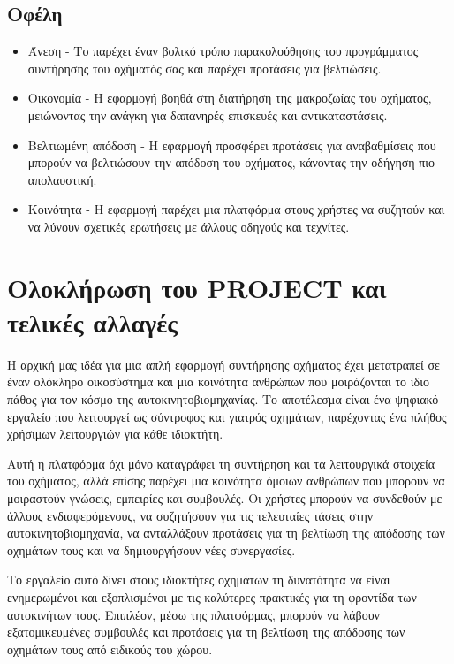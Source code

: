 \documentclass[11pt]{scrartcl} %
\begin{document}
\subsection{Οφέλη}
    \begin{itemize}
        \item Άνεση - Το  παρέχει έναν βολικό τρόπο παρακολούθησης του προγράμματος συντήρησης του οχήματός σας και παρέχει προτάσεις για βελτιώσεις.
        \item Οικονομία - Η εφαρμογή βοηθά στη διατήρηση της μακροζωίας του οχήματος, μειώνοντας την ανάγκη για δαπανηρές επισκευές και αντικαταστάσεις.
        \item Βελτιωμένη απόδοση - Η εφαρμογή προσφέρει προτάσεις για αναβαθμίσεις που μπορούν να βελτιώσουν την απόδοση του οχήματος, κάνοντας την οδήγηση πιο απολαυστική.
        \item Κοινότητα - Η εφαρμογή παρέχει μια πλατφόρμα στους χρήστες να συζητούν και να λύνουν σχετικές ερωτήσεις με άλλους οδηγούς και τεχνίτες.
    \end{itemize}

\pagebreak

\section{Ολοκλήρωση του PROJECT και τελικές αλλαγές}
Η αρχική μας ιδέα για μια απλή εφαρμογή συντήρησης οχήματος έχει μετατραπεί σε έναν ολόκληρο οικοσύστημα και μια κοινότητα ανθρώπων που μοιράζονται το ίδιο πάθος για τον κόσμο της αυτοκινητοβιομηχανίας. Το αποτέλεσμα είναι ένα ψηφιακό εργαλείο που λειτουργεί ως σύντροφος και γιατρός οχημάτων, παρέχοντας ένα πλήθος χρήσιμων λειτουργιών για κάθε ιδιοκτήτη.

Αυτή η πλατφόρμα όχι μόνο καταγράφει τη συντήρηση και τα λειτουργικά στοιχεία του οχήματος, αλλά επίσης παρέχει μια κοινότητα όμοιων ανθρώπων που μπορούν να μοιραστούν γνώσεις, εμπειρίες και συμβουλές. Οι χρήστες μπορούν να συνδεθούν με άλλους ενδιαφερόμενους, να συζητήσουν για τις τελευταίες τάσεις στην αυτοκινητοβιομηχανία, να ανταλλάξουν προτάσεις για τη βελτίωση της απόδοσης των οχημάτων τους και να δημιουργήσουν νέες συνεργασίες.

Το εργαλείο αυτό δίνει στους ιδιοκτήτες οχημάτων τη δυνατότητα να είναι ενημερωμένοι και εξοπλισμένοι με τις καλύτερες πρακτικές για τη φροντίδα των αυτοκινήτων τους. Επιπλέον, μέσω της πλατφόρμας, μπορούν να λάβουν εξατομικευμένες συμβουλές και προτάσεις για τη βελτίωση της απόδοσης των οχημάτων τους από ειδικούς του χώρου.
\end{document}
